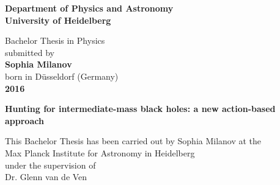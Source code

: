 \begin{titlepage}
\begin{center}
 
\Large\textbf{Department of Physics and Astronomy\\
University of Heidelberg}

\vspace{15cm}

\normalsize
Bachelor Thesis in Physics\\
submitted by \\
\vspace{0.5cm}
\Large\textbf{Sophia Milanov}\\
\normalsize
\vspace{0.5cm}
born in Düsseldorf (Germany)\\
\vspace{0.5cm}
\Large\textbf{2016}
\normalsize

\newpage




\Large\textbf{Hunting for intermediate-mass black holes: a new action-based approach}

\vspace{18cm}

\normalsize
This Bachelor Thesis has been carried out by Sophia Milanov at the\\
Max Planck Institute for Astronomy in Heidelberg\\
under the supervision of\\
Dr. Glenn van de Ven

\vfill
\end{center}

\end{titlepage}
